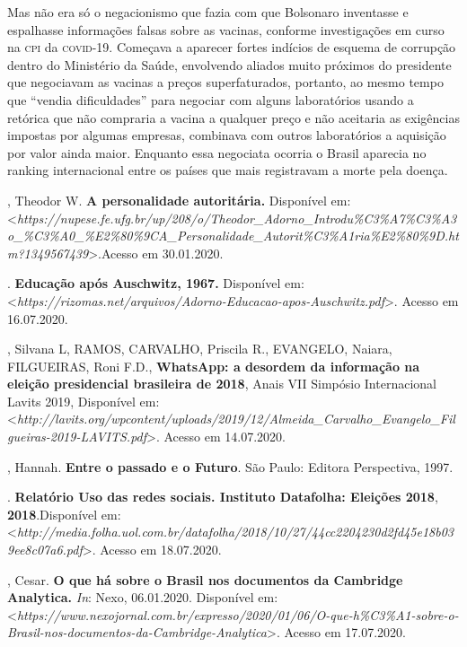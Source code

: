 Mas não era só o negacionismo que fazia com que Bolsonaro inventasse e
espalhasse informações falsas sobre as vacinas, conforme investigações
em curso na \textsc{cpi} da \textsc{covid-19}. Começava a aparecer fortes indícios de
esquema de corrupção dentro do Ministério da Saúde, envolvendo aliados
muito próximos do presidente que negociavam as vacinas a preços
superfaturados, portanto, ao mesmo tempo que ``vendia dificuldades''
para negociar com alguns laboratórios usando a retórica que não
compraria a vacina a qualquer preço e não aceitaria as exigências
impostas por algumas empresas, combinava com outros laboratórios a
aquisição por valor ainda maior. Enquanto essa negociata ocorria o
Brasil aparecia no ranking internacional entre os países que mais
registravam a morte pela doença.

\begin{bibliohedra}
, Theodor W. \textbf{A personalidade autoritária.} Disponível em:
\textless{}\textit{https://nupese.fe.ufg.br/up/208/o/Theodor\_Adorno\_Introdu\%C3\%A7\%C3\%A3o\_\%C3\%A0\_\%E2\%80\%9CA\_Personalidade\_Autorit\%C3\%A1ria\%E2\%80\%9D.htm?1349567439}\textgreater{}.Acesso
em 30.01.2020.

\titidem. \textbf{Educação após Auschwitz,
1967.} Disponível em:
\textless{}\textit{https://rizomas.net/arquivos/Adorno-Educacao-apos-Auschwitz.pdf}\textgreater{}.
Acesso em 16.07.2020.

, Silvana L, RAMOS, CARVALHO, Priscila R., EVANGELO, Naiara,
FILGUEIRAS, Roni F.D., \textbf{WhatsApp: a desordem da informação na
eleição presidencial brasileira de 2018}, Anais VII Simpósio
Internacional Lavits 2019, Disponível em:
\textless{}\textit{http://lavits.org/wpcontent/uploads/2019/12/Almeida\_Carvalho\_Evangelo\_Filgueiras-2019-LAVITS.pdf}\textgreater{}.
Acesso em 14.07.2020.

, Hannah. \textbf{Entre o passado e o Futuro}. São Paulo: Editora
Perspectiva, 1997.

. \textbf{Relatório Uso das redes sociais. Instituto
Datafolha: Eleições 2018}, \textbf{2018}.Disponível em:
\textless{}\textit{http://media.folha.uol.com.br/datafolha/2018/10/27/44cc2204230d2fd45e18b039ee8c07a6.pdf}\textgreater{}.
Acesso em 18.07.2020.

, Cesar. \textbf{O que há sobre o Brasil nos documentos da
Cambridge Analytica.} \textit{In}: Nexo, 06.01.2020. Disponível em:
\textless{}\textit{https://www.nexojornal.com.br/expresso/2020/01/06/O-que-h\%C3\%A1-sobre-o-Brasil-nos-documentos-da-Cambridge-Analytica}\textgreater{}.
Acesso em 17.07.2020.


\end{bibliohedra}
